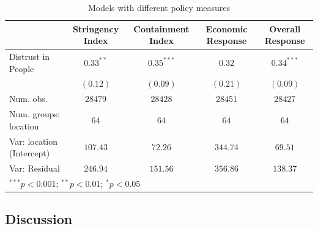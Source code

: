 \documentclass[
  12pt,
]{article}
\begin{document}
\begin{table}
\caption{Models with different policy measures}
\begin{center}
\begin{small}
\begin{tabular}{l c c c c}
\hline
 & Stringency
Index & Containment
Index & Economic
Response & Overall
Response \\
\hline
Distrust in People        & $0.33^{**}$ & $0.35^{***}$ & $0.32$   & $0.34^{***}$ \\
                          & $(0.12)$    & $(0.09)$     & $(0.21)$ & $(0.09)$     \\
\hline
Num. obs.                 & $28479$     & $28428$      & $28451$  & $28427$      \\
Num. groups: location     & $64$        & $64$         & $64$     & $64$         \\
Var: location (Intercept) & $107.43$    & $72.26$      & $344.74$ & $69.51$      \\
Var: Residual             & $246.94$    & $151.56$     & $356.86$ & $138.37$     \\
\hline
\multicolumn{5}{l}{\tiny{$^{***}p<0.001$; $^{**}p<0.01$; $^{*}p<0.05$}}
\end{tabular}
\end{small}
\label{tab:policy}
\end{center}
\end{table}

\hypertarget{discussion}{%
\subsection{Discussion}\label{discussion}}
\end{document}
